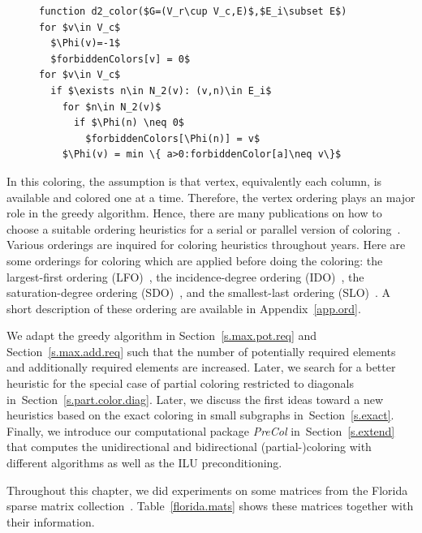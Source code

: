 \documentclass[12pt, twoside,a4paper,toc=bibliography]{scrbook}
\newcommand{\secref}[1]{Section~\protect\ref{#1}}
\newcommand{\appref}[1]{Appendix~\protect\ref{#1}}
\begin{document}
\begin{figure}
\begin{lstlisting}[caption=The greedy algorithm for
the distance-$2$ coloring restricted to the edge set $E_i$
for columns in which $N_2(v)$ shows
the distance-$2$ neighbors of $v$.
,label=code.greedy,mathescape]
function d2_color($G=(V_r\cup V_c,E)$,$E_i\subset E$)
for $v\in V_c$
  $\Phi(v)=-1$
  $forbiddenColors[v] = 0$
for $v\in V_c$
  if $\exists n\in N_2(v): (v,n)\in E_i$
    for $n\in N_2(v)$
      if $\Phi(n) \neq 0$
        $forbiddenColors[\Phi(n)] = v$
    $\Phi(v) = min \{ a>0:forbiddenColor[a]\neq v\}$
\end{lstlisting}
\end{figure}

In this coloring, the assumption is that vertex,
equivalently each column, is available and colored one at a time.
Therefore, the vertex ordering plays an major role in the greedy algorithm.
Hence, there are many publications on how to choose
a suitable ordering heuristics for a serial or parallel version of
coloring~\cite{ordering1,ordering2,ordering3}.
Various orderings are inquired for coloring heuristics
throughout years. Here are some orderings for coloring which are applied before doing the coloring:
the largest-first ordering (LFO)~\cite{LFO}, the incidence-degree ordering (IDO)~\cite{IDO},
the saturation-degree ordering (SDO)~\cite{SDO}, and the smallest-last ordering (SLO)~\cite{ordering1}.
A short description of these ordering are available in \appref{app.ord}.

We adapt the greedy algorithm in \secref{s.max.pot.req} and \secref{s.max.add.req}
 such that the number of potentially required elements
and additionally required elements are increased.
Later, 
we search for a better heuristic for
the special case of partial coloring restricted to diagonals in~\secref{s.part.color.diag}.
Later, we discuss the first ideas toward a new heuristics based on the exact coloring in small
subgraphs in~\secref{s.exact}.
Finally, we introduce our computational package \textit{PreCol} in~\secref{s.extend} that computes the 
unidirectional and bidirectional (partial-)coloring with different algorithms
as well as the ILU preconditioning. 

Throughout this chapter, we did experiments on some matrices from the Florida sparse
matrix collection~\cite{florida.matrices}. Table~\ref{florida.mats} shows these matrices
together with their information.
\end{document}
